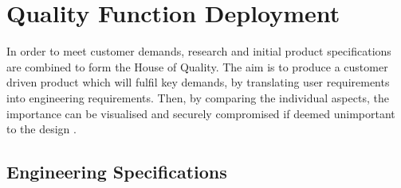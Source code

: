 \documentclass[a4paper,11pt]{article}
\begin{document}
\section{Quality Function Deployment}

In order to meet customer demands, research and initial product specifications are combined to form the House of Quality. The aim is to produce a customer driven product which will fulfil key demands, by translating user requirements into engineering requirements. Then, by comparing the individual aspects, the importance can be visualised and securely compromised if deemed unimportant to the design \cite{fran01}.

\subsection{Engineering Specifications}
\end{document}
